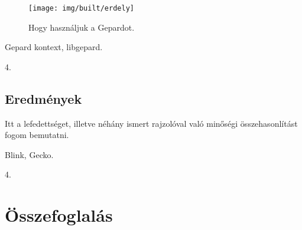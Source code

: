 \documentclass[12pt]{report}
\theoremstyle{definition}
\begin{document}
  \begin{figure}[!htb]
    \centering
    \texttt{[image: img/built/erdely]}
    \caption{\label{erdely} Hogy használjuk a Gepardot.}
  \end{figure}

  \begin{description}[noitemsep]
    \item[Kulcsszavak] Gepard kontext, libgepard.
    \item[Becsült oldalszám] 4.
  \end{description}

    \section{Eredmények}
    \label{Eredmények}

  Itt a lefedettséget, illetve néhány ismert rajzolóval való minőségi
összehasonlítást fogom bemutatni.

  \begin{description}[noitemsep]
    \item[Kulcsszavak] Blink, Gecko.
    \item[Becsült oldalszám] 4.
  \end{description}



    \chapter{Összefoglalás}



    \nocite{Foley:1990:CGP:83821}
    {}
    


\end{document}
